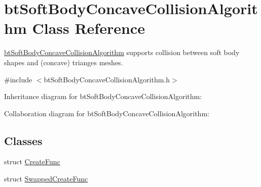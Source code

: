 \hypertarget{classbt_soft_body_concave_collision_algorithm}{\section{bt\+Soft\+Body\+Concave\+Collision\+Algorithm Class Reference}
\label{classbt_soft_body_concave_collision_algorithm}
}


\hyperlink{classbt_soft_body_concave_collision_algorithm}{bt\+Soft\+Body\+Concave\+Collision\+Algorithm} supports collision between soft body shapes and (concave) trianges meshes.  




{\ttfamily \#include $<$bt\+Soft\+Body\+Concave\+Collision\+Algorithm.\+h$>$}



Inheritance diagram for bt\+Soft\+Body\+Concave\+Collision\+Algorithm\+:


Collaboration diagram for bt\+Soft\+Body\+Concave\+Collision\+Algorithm\+:
\subsection*{Classes}
\begin{DoxyCompactItemize}
\item 
struct \hyperlink{structbt_soft_body_concave_collision_algorithm_1_1_create_func}{Create\+Func}
\item 
struct \hyperlink{structbt_soft_body_concave_collision_algorithm_1_1_swapped_create_func}{Swapped\+Create\+Func}
\end{DoxyCompactItemize}
